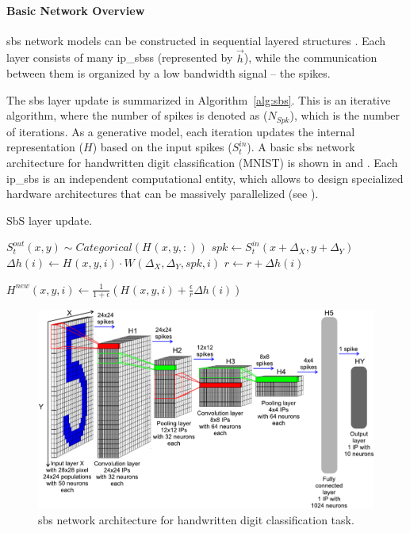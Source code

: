 \paragraph{Basic Network Overview}

\gls{sbs} network models can be constructed in sequential layered structures \cite{rotermund2019Backpropagation}. Each layer consists of many \glspl{ip_sbs} (represented by $\vec{h}$), while the communication between them is organized by a low bandwidth signal -- the spikes.

The \gls{sbs} layer update is summarized in Algorithm~\ref{alg:sbs}. This is an iterative algorithm, where the number of spikes is denoted as ($N_{Spk}$), which is the number of iterations. As a generative model, each iteration updates the internal representation ($H$) based on the input spikes ($S^{in}_t$). A basic \gls{sbs} network architecture for handwritten digit classification (MNIST) is shown in  and . Each \gls{ip_sbs} is an independent computational entity, which allows to design specialized hardware architectures that can be massively parallelized (see ).


\begin{algorithm}
	\caption{SbS layer update.}\label{alg:sbs}
	
	\begin{algorithmic}[1]
		\STATE $S^{out}_t(x, y) \sim Categorical( H^{}(x, y, :) ) $
		\STATE $spk \leftarrow S^{in}_t(x + \Delta_X , y + \Delta_Y)$
		\STATE $\Delta h(i)
		\leftarrow H^{}(x, y,  i) \cdot W^{}(\Delta_X, \Delta_Y, spk, i)$
		\STATE $r \leftarrow r + \Delta h(i)$
		\ENDFOR
		
		\STATE $H^{new}(x, y, i) \leftarrow \frac{1}{1+\epsilon} \left( H^{}(x, y, i) + \frac{\epsilon}{r} \Delta h(i) \right) $              
		\ENDFOR
		\ENDFOR
		\ENDFOR
		\ENDFOR
	\end{algorithmic} 
\end{algorithm}

\begin{figure}
	\centering
	\includegraphics[width=0.5\columnwidth]{./chapters/sbs_accelerator/figures/sbs_network.pdf}
	\caption{\gls{sbs} network architecture for handwritten digit classification task.}
	\label{fig:sbs_network}
\end{figure}


